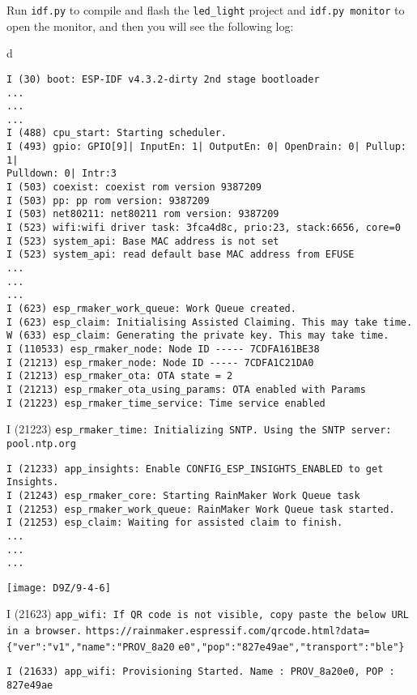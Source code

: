 \documentclass[a4paper,12pt]{book}
\begin{document}
Run \verb|idf.py| to compile and flash the \verb|led_light| project and \verb|idf.py monitor| to open the monitor, and then you will see the following log:

\begin{codebloc}
\begin{tabular}{d}
\vspace{2pt}
\begin{verbatim}
I (30) boot: ESP-IDF v4.3.2-dirty 2nd stage bootloader
...
...
...
I (488) cpu_start: Starting scheduler.
I (493) gpio: GPIO[9]| InputEn: 1| OutputEn: 0| OpenDrain: 0| Pullup: 1| 
Pulldown: 0| Intr:3
I (503) coexist: coexist rom version 9387209
I (503) pp: pp rom version: 9387209
I (503) net80211: net80211 rom version: 9387209
I (523) wifi:wifi driver task: 3fca4d8c, prio:23, stack:6656, core=0
I (523) system_api: Base MAC address is not set
I (523) system_api: read default base MAC address from EFUSE
...
...
...
I (623) esp_rmaker_work_queue: Work Queue created.
I (623) esp_claim: Initialising Assisted Claiming. This may take time.
W (633) esp_claim: Generating the private key. This may take time.
I (110533) esp_rmaker_node: Node ID ----- 7CDFA161BE38
I (21213) esp_rmaker_node: Node ID ----- 7CDFA1C21DA0
I (21213) esp_rmaker_ota: OTA state = 2
I (21213) esp_rmaker_ota_using_params: OTA enabled with Params
I (21223) esp_rmaker_time_service: Time service enabled
\end{verbatim}
I (21223) \fontsize{9.5pt}{10pt}\selectfont\verb|esp_rmaker_time: Initializing SNTP. Using the SNTP server: pool.ntp.org|
\footnotesize
\begin{verbatim}
I (21233) app_insights: Enable CONFIG_ESP_INSIGHTS_ENABLED to get Insights.
I (21243) esp_rmaker_core: Starting RainMaker Work Queue task
I (21253) esp_rmaker_work_queue: RainMaker Work Queue task started.
I (21253) esp_claim: Waiting for assisted claim to finish.
...
...
...
\end{verbatim}
\vspace{5pt}
\texttt{[image: D9Z/9-4-6]}

I (21623) \fontsize{9pt}{10pt}\selectfont\verb|app_wifi: If QR code is not visible, copy paste the below URL in a browser.|
\footnotesize
\verb|https://rainmaker.espressif.com/qrcode.html?data={"ver":"v1","name":"PROV_8a20|
\verb|e0","pop":"827e49ae","transport":"ble"}|

\verb|I (21633) app_wifi: Provisioning Started. Name : PROV_8a20e0, POP : 827e49ae|
\end{tabular}
\end{codebloc}
\end{document}
